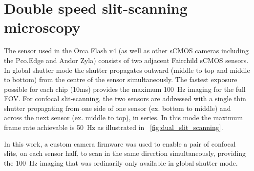 \section{Double speed \gls{slit-scanning} microscopy}
The sensor used in the Orca Flash v4 (as well as other \gls{sCMOS} cameras including the Pco.Edge and Andor Zyla) consists of two adjacent Fairchild \gls{sCMOS} sensors.
In global shutter mode the shutter propagates outward (middle to top and middle to bottom) from the centre of the sensor simultaneously.
The fastest exposure possible for each chip (10ms) provides the maximum \SI{100}{\hertz} imaging for the full \gls{FOV}.
For confocal \gls{slit-scanning}, the two sensors are addressed with a single thin shutter propagating from one side of one sensor (ex. bottom to middle) and across the next sensor (ex. middle to top), in series.
In this mode the maximum frame rate achievable is \SI{50}{\hertz} as illustrated in \figurename~\ref{fig:dual_slit_scanning}.

In this work, a custom camera firmware was used to enable a pair of confocal slits, on each sensor half, to scan in the same direction simultaneously, providing the \SI{100}{\hertz} imaging that was ordinarily only available in global shutter mode.


